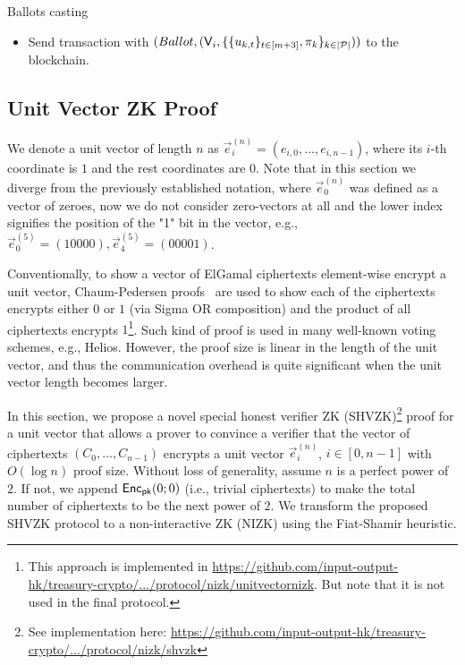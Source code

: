 \begin{boxfig}{\label{fig:vote}Ballots casting}{}
\begin{itemize}
\begin{itemize}
\begin{itemize}
			    \item pick randomness $r_{k,1},\ldots, r_{k,m+3}\leftarrow \ZZ_q$ and compute $u_{k,t}\leftarrow \Enc_{\pk}(e^{(m+3)}_{k,t}; r_{k,t})$, $t\in[m+3]$;
			    \item produce a unit vector proof $\pi_k$ showing that $\{u_{k,t}\}_{t\in[m+3]}$ encrypts a unit vector.
			\end{itemize}
			  
			\item Send transaction with $(Ballot, (\mathsf{V}_i, \{\{u_{k,t}\}_{t\in[m+3]}, \pi_k\}_{k \in |\mathcal{P}|}))$ to the blockchain.
		\end{itemize}	
	\end{itemize}
\end{boxfig}

\FloatBarrier
\subsection{Unit Vector ZK Proof}\label{sec:SHVZK}
We denote a unit vector of length $n$ as $\vec{e}_i^{(n)} = (e_{i,0},\ldots, e_{i,n-1})$,  where its $i$-th coordinate is $1$ and the rest coordinates are $0$. Note that in this section we diverge from the previously established notation, where $\vec{e}_0^{(n)}$ was defined as a vector of zeroes, now we do not consider zero-vectors at all and the lower index signifies the position of the "1" bit in the vector, e.g., $\vec{e}_0^{(5)}=(10000), \vec{e}_4^{(5)}=(00001)$.

Conventionally, to show a vector of ElGamal ciphertexts element-wise encrypt a unit vector, Chaum-Pedersen proofs~\cite{CP92} are used to show each of the ciphertexts encrypts either $0$ or $1$ (via Sigma OR composition) and the product of all ciphertexts encrypts $1$\footnote{This approach is implemented in \href{https://github.com/input-output-hk/treasury-crypto/tree/master/src/main/scala/io/iohk/protocol/nizk/unitvectornizk}{https://github.com/input-output-hk/treasury-crypto/.../protocol/nizk/unitvectornizk}. But note that it is not used in the final protocol.}. Such kind of proof is used in many well-known voting schemes, e.g., Helios. However, the proof size is linear in the length of the unit vector, and thus the communication overhead is quite significant when the unit vector length becomes larger. 

In this section, we propose a novel special honest verifier ZK  (SHVZK)\footnote{See implementation here: \href{https://github.com/input-output-hk/treasury-crypto/tree/master/src/main/scala/io/iohk/protocol/nizk/shvzk}{https://github.com/input-output-hk/treasury-crypto/.../protocol/nizk/shvzk}} proof for a unit vector that allows a prover to convince a verifier that the vector of ciphertexts $(C_0,\ldots, C_{n-1})$ encrypts a unit vector $\vec{e}_i^{(n)}$, $i\in[0, n-1]$ with $O(\log n)$  proof size. Without loss of generality, assume $n$ is a perfect power of $2$. If not, we append $\mathsf{Enc}_{\mathsf{pk}}(0;0)$ (i.e., trivial ciphertexts) to make the total number of ciphertexts to be the next power of $2$. We transform the proposed SHVZK protocol to a non-interactive ZK (NIZK) using the Fiat-Shamir heuristic.

